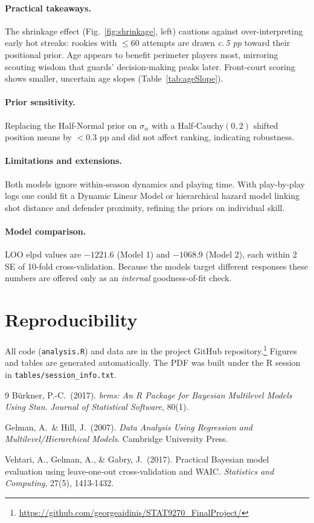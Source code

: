 \documentclass[11pt,letterpaper,onecolumn]{article}
\begin{document}
\paragraph{Practical takeaways.}
The shrinkage effect (Fig.~\ref{fig:shrinkage}, left) cautions
against over-interpreting early hot streaks: rookies with $\le60$ attempts
are drawn \emph{c.\,5 pp} toward their positional prior.
Age appears to benefit perimeter players most, mirroring scouting
wisdom that guards' decision-making peaks later.
Front-court scoring shows smaller, uncertain age slopes
(Table~\ref{tab:ageSlope}).

\paragraph{Prior sensitivity.}
Replacing the Half-Normal prior on $\sigma_\alpha$ with a Half-Cauchy$(0,2)$
shifted position means by $<0.3$ pp and did not affect ranking,
indicating robustness.

\paragraph{Limitations and extensions.}
Both models ignore within-season dynamics and playing time.
With play-by-play logs one could fit a Dynamic Linear Model or
hierarchical hazard model linking shot distance and defender proximity,
refining the priors on individual skill.

\paragraph{Model comparison.}
LOO elpd values are $-1221.6$ (Model 1) and $-1068.9$ (Model 2),
each within 2 SE of 10-fold cross-validation.  Because the models target
different responses these numbers are offered only as an
\emph{internal} goodness-of-fit check.

\section*{Reproducibility}

All code (\texttt{analysis.R}) and data are in the project GitHub
repository.\footnote{\url{https://github.com/georgeaidinis/STAT9270_FinalProject/}}
Figures and tables are generated automatically.
The PDF was built under the \textsf{R} session in
\texttt{tables/session\_info.txt}.

\begin{thebibliography}{9}\setlength{\itemsep}{2pt}
  Bürkner, P.-C.\ (2017).
  \emph{brms: An R Package for Bayesian Multilevel Models Using Stan}.
  \textit{Journal of Statistical Software}, 80(1).
  
  Gelman, A.\ \& Hill, J.\ (2007).
  \emph{Data Analysis Using Regression and Multilevel/Hierarchical Models}.
  Cambridge University Press.
  
  Vehtari, A., Gelman, A., \& Gabry, J.\ (2017).
  Practical Bayesian model evaluation using leave‐one‐out cross‐validation and WAIC.
  \textit{Statistics and Computing}, 27(5), 1413-1432.
  \end{thebibliography}
\end{document}
